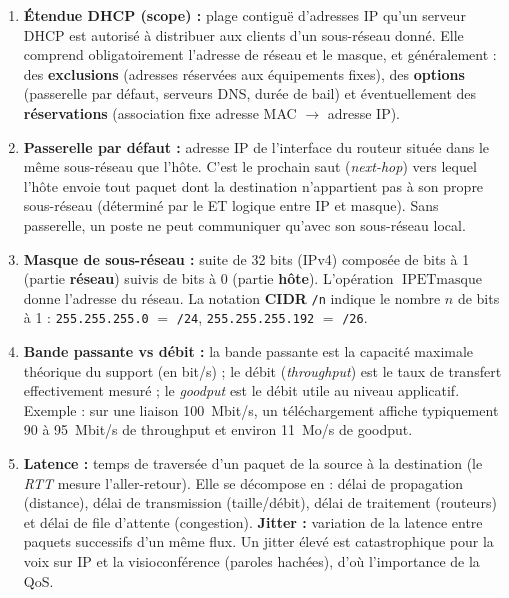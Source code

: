 \documentclass[11pt]{article}
\begin{document}
\begin{corrige}
\begin{enumerate}
    \item \textbf{Étendue DHCP (scope) :} plage contiguë d'adresses IP qu'un serveur DHCP est autorisé à distribuer aux clients d'un sous-réseau donné. Elle comprend obligatoirement l'adresse de réseau et le masque, et généralement : des \textbf{exclusions} (adresses réservées aux équipements fixes), des \textbf{options} (passerelle par défaut, serveurs DNS, durée de bail) et éventuellement des \textbf{réservations} (association fixe adresse MAC $\to$ adresse IP).
    \item \textbf{Passerelle par défaut :} adresse IP de l'interface du routeur située dans le même sous-réseau que l'hôte. C'est le prochain saut (\emph{next-hop}) vers lequel l'hôte envoie tout paquet dont la destination n'appartient pas à son propre sous-réseau (déterminé par le ET logique entre IP et masque). Sans passerelle, un poste ne peut communiquer qu'avec son sous-réseau local.
    \item \textbf{Masque de sous-réseau :} suite de 32 bits (IPv4) composée de bits à 1 (partie \textbf{réseau}) suivis de bits à 0 (partie \textbf{hôte}). L'opération $\text{IP} \mathbin{\text{ET}} \text{masque}$ donne l'adresse du réseau. La notation \textbf{CIDR} \texttt{/n} indique le nombre $n$ de bits à 1 : \texttt{255.255.255.0} $=$ \texttt{/24}, \texttt{255.255.255.192} $=$ \texttt{/26}.
    \item \textbf{Bande passante vs débit :} la bande passante est la capacité maximale théorique du support (en bit/s) ; le débit (\emph{throughput}) est le taux de transfert effectivement mesuré ; le \emph{goodput} est le débit utile au niveau applicatif. Exemple : sur une liaison \SI{100}{Mbit/s}, un téléchargement affiche typiquement 90 à \SI{95}{Mbit/s} de throughput et environ \SI{11}{Mo/s} de goodput.
    \item \textbf{Latence :} temps de traversée d'un paquet de la source à la destination (le \emph{RTT} mesure l'aller-retour). Elle se décompose en : délai de propagation (distance), délai de transmission (taille/débit), délai de traitement (routeurs) et délai de file d'attente (congestion). \textbf{Jitter :} variation de la latence entre paquets successifs d'un même flux. Un jitter élevé est catastrophique pour la voix sur IP et la visioconférence (paroles hachées), d'où l'importance de la QoS.
\end{enumerate}
\end{corrige}
\end{document}
